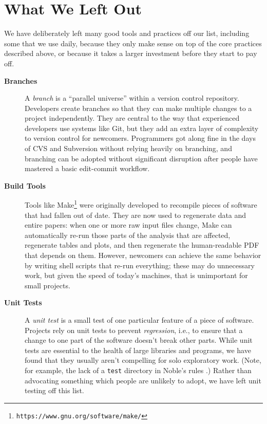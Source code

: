 \documentclass[10pt,letterpaper]{article}
\newcommand{\withurl}[2]{{#1}\footnote{{\texttt{#2}}}}
\begin{document}
\section*{What We Left Out}\label{sec:omitted}

We have deliberately left many good tools and practices off our list,
including some that we use daily, because they only make sense on top
of the core practices described above, or because it takes a larger
investment before they start to pay off.

\begin{description}

\item[\textbf{Branches}] A \emph{branch} is a ``parallel universe''
  within a version control repository. Developers create branches so
  that they can make multiple changes to a project independently. They
  are central to the way that experienced developers use systems like
  Git, but they add an extra layer of complexity to version control
  for newcomers.  Programmers got along fine in the days of CVS and
  Subversion without relying heavily on branching, and branching can
  be adopted without significant disruption after people have mastered
  a basic edit-commit workflow.

\item[\textbf{Build Tools}] Tools like
  \withurl{Make}{https://www.gnu.org/software/make/} were originally
  developed to recompile pieces of software that had fallen out of
  date. They are now used to regenerate data and entire papers: when
  one or more raw input files change, Make can automatically re-run
  those parts of the analysis that are affected, regenerate tables and
  plots, and then regenerate the human-readable PDF that depends on
  them.  However, newcomers can achieve the same behavior by writing
  shell scripts that re-run everything; these may do unnecessary work,
  but given the speed of today's machines, that is unimportant for
  small projects.

\item[\textbf{Unit Tests}] A \emph{unit test} is a small test of one
  particular feature of a piece of software. Projects rely on unit
  tests to prevent \emph{regression}, i.e., to ensure that a change to
  one part of the software doesn't break other parts. While unit tests
  are essential to the health of large libraries and programs, we have
  found that they usually aren't compelling for solo exploratory
  work. (Note, for example, the lack of a \texttt{test} directory in
  Noble's rules \cite{noble2009}.)  Rather than advocating something
  which people are unlikely to adopt, we have left unit testing off
  this list.


\end{description}
\end{document}

